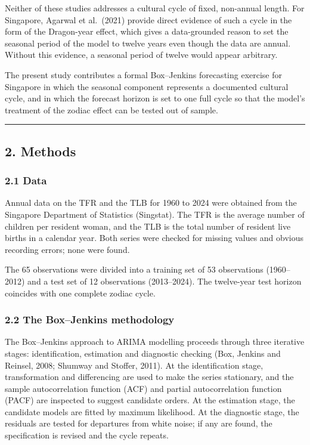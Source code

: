 \documentclass[
  11pt,
]{article}
\newcounter{none} %
\begin{document}
Neither of these studies addresses a cultural cycle of fixed, non-annual
length. For Singapore, Agarwal et al.~(2021) provide direct evidence of
such a cycle in the form of the Dragon-year effect, which gives a
data-grounded reason to set the seasonal period of the model to twelve
years even though the data are annual. Without this evidence, a seasonal
period of twelve would appear arbitrary.

The present study contributes a formal Box--Jenkins forecasting exercise
for Singapore in which the seasonal component represents a documented
cultural cycle, and in which the forecast horizon is set to one full
cycle so that the model's treatment of the zodiac effect can be tested
out of sample.

\begin{center}\rule{0.5\linewidth}{0.5pt}\end{center}

\subsection{2. Methods}\label{methods}

\subsubsection{2.1 Data}\label{data}

Annual data on the TFR and the TLB for 1960 to 2024 were obtained from
the Singapore Department of Statistics (Singstat). The TFR is the
average number of children per resident woman, and the TLB is the total
number of resident live births in a calendar year. Both series were
checked for missing values and obvious recording errors; none were
found.

The 65 observations were divided into a training set of 53 observations
(1960--2012) and a test set of 12 observations (2013--2024). The
twelve-year test horizon coincides with one complete zodiac cycle.

\subsubsection{2.2 The Box--Jenkins
methodology}\label{the-boxjenkins-methodology}

The Box--Jenkins approach to ARIMA modelling proceeds through three
iterative stages: identification, estimation and diagnostic checking
(Box, Jenkins and Reinsel, 2008; Shumway and Stoffer, 2011). At the
identification stage, transformation and differencing are used to make
the series stationary, and the sample autocorrelation function (ACF) and
partial autocorrelation function (PACF) are inspected to suggest
candidate orders. At the estimation stage, the candidate models are
fitted by maximum likelihood. At the diagnostic stage, the residuals are
tested for departures from white noise; if any are found, the
specification is revised and the cycle repeats.
\end{document}
